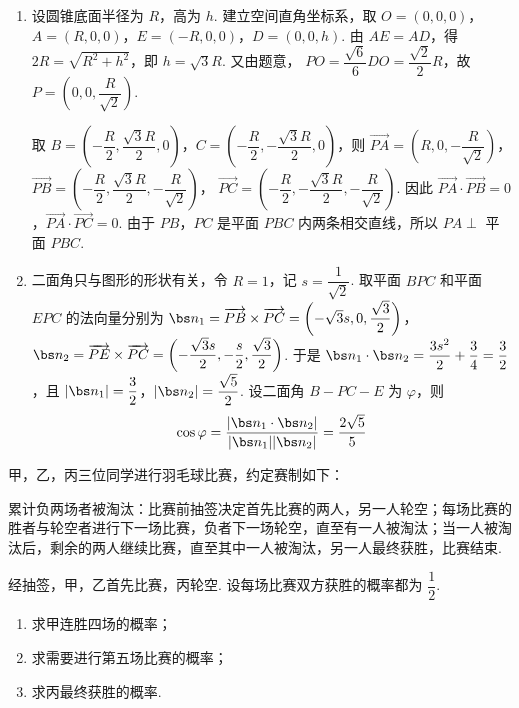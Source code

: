 \begin{solution}
\begin{enumerate}
\item 设圆锥底面半径为 \(R\)，高为 \(h\). 建立空间直角坐标系，取
\(O=(0,0,0)\)，\(A=(R,0,0)\)，\(E=(-R,0,0)\)，\(D=(0,0,h)\). 由 \(AE=AD\)，得 \(2R=\sqrt{R^2+h^2}\)，即 \(h=\sqrt{3}R\). 又由题意，
\(PO=\dfrac{\sqrt{6}}{6}DO=\dfrac{\sqrt{2}}{2}R\)，故 \(P=\left(0,0,\dfrac{R}{\sqrt{2}}\right)\).

取
\(B=\left(-\dfrac{R}{2},\dfrac{\sqrt{3}R}{2},0\right)\)，\(C=\left(-\dfrac{R}{2},-\dfrac{\sqrt{3}R}{2},0\right)\)，则
\(\overrightarrow{PA}=\left(R,0,-\dfrac{R}{\sqrt{2}}\right)\)，
\(\overrightarrow{PB}=\left(-\dfrac{R}{2},\dfrac{\sqrt{3}R}{2},-\dfrac{R}{\sqrt{2}}\right)\)，
\(\overrightarrow{PC}=\left(-\dfrac{R}{2},-\dfrac{\sqrt{3}R}{2},-\dfrac{R}{\sqrt{2}}\right)\). 因此
\(\overrightarrow{PA}\cdot\overrightarrow{PB}=0\)，\(\overrightarrow{PA}\cdot\overrightarrow{PC}=0\). 由于 \(PB\)，\(PC\) 是平面 \(PBC\) 内两条相交直线，所以 \(PA\perp\) 平面 \(PBC\).

\item 二面角只与图形的形状有关，令 \(R=1\)，记 \(s=\dfrac{1}{\sqrt{2}}\). 取平面 \(BPC\) 和平面 \(EPC\) 的法向量分别为
\(\bs n_1=\overrightarrow{PB}\times\overrightarrow{PC}=\left(-\sqrt{3}s,0,\dfrac{\sqrt{3}}{2}\right)\)，\(\bs n_2=\overrightarrow{PE}\times\overrightarrow{PC}=\left(-\dfrac{\sqrt{3}s}{2},-\dfrac{s}{2},\dfrac{\sqrt{3}}{2}\right)\).
于是 \(\bs n_1\cdot\bs n_2=\dfrac{3s^2}{2}+\dfrac{3}{4}=\dfrac{3}{2}\)，且 \(\lvert\bs n_1\rvert=\dfrac{3}{2}\)，\(\lvert\bs n_2\rvert=\dfrac{\sqrt{5}}{2}\). 设二面角 \(B-PC-E\) 为 \(\varphi\)，则
\[
\cos\varphi=\frac{\lvert\bs n_1\cdot\bs n_2\rvert}{\lvert\bs n_1\rvert\lvert\bs n_2\rvert}=\frac{2\sqrt{5}}{5}
\]
\end{enumerate}
\end{solution}

\begin{problem}
甲，乙，丙三位同学进行羽毛球比赛，约定赛制如下：

累计负两场者被淘汰：比赛前抽签决定首先比赛的两人，另一人轮空；每场比赛的胜者与轮空者进行下一场比赛，负者下一场轮空，直至有一人被淘汰；当一人被淘汰后，剩余的两人继续比赛，直至其中一人被淘汰，另一人最终获胜，比赛结束.

经抽签，甲，乙首先比赛，丙轮空. 设每场比赛双方获胜的概率都为 \(\dfrac{1}{2}\).

\begin{enumerate}
\item 求甲连胜四场的概率；

\item 求需要进行第五场比赛的概率；

\item 求丙最终获胜的概率.
\end{enumerate}
\end{problem}

